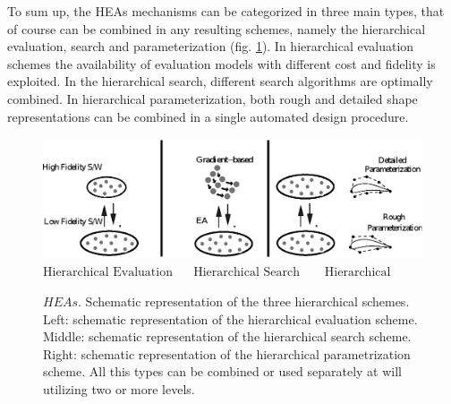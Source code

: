 To sum up, the HEAs mechanisms can be categorized in three main types, that of course can be combined in any resulting schemes, namely the hierarchical evaluation,  search and parameterization (fig. \ref{allheas}). In hierarchical evaluation schemes the availability of evaluation models with different cost and fidelity is exploited. In  the hierarchical search, different search algorithms are optimally combined. In hierarchical parameterization, both rough and detailed shape representations can be combined in a single automated design procedure. 

\begin{figure}[h!]
    \centering
    \includegraphics[scale=0.8]{multimodes.eps}
    $\mbox{Hierarchical Evaluation~~~~~Hierarchical Search~~~~~~Hierarchical Parameterization}$
    \caption{$HEAs$. Schematic representation of the three
            hierarchical schemes. Left: schematic representation of the hierarchical evaluation scheme. Middle: schematic representation of the hierarchical search scheme. Right: schematic representation of the hierarchical parametrization scheme. All this types can be combined or used separately at will utilizing two or more levels.}
    \label{allheas}
\end{figure}      
